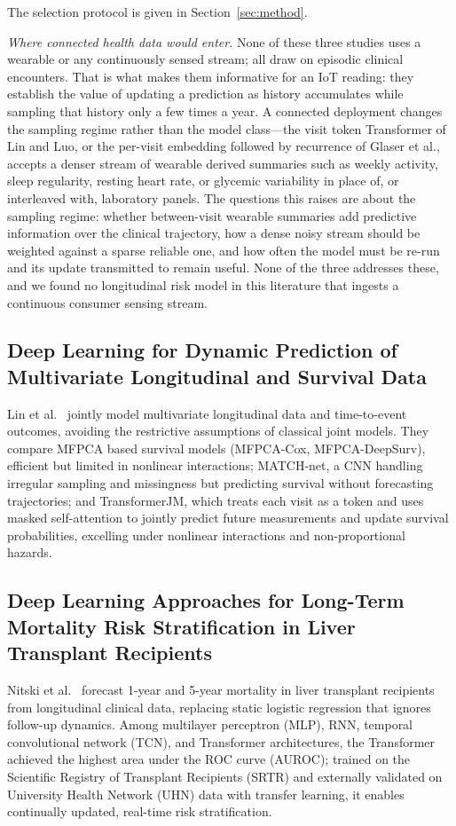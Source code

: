 \documentclass[journal]{IEEEtran}
\begin{document}
The selection protocol is given in Section~\ref{sec:method}.

\emph{Where connected health data would enter.} None of these three studies uses a wearable or any continuously sensed stream; all draw on episodic clinical encounters. That is what makes them informative for an IoT reading: they establish the value of updating a prediction as history accumulates while sampling that history only a few times a year. A connected deployment changes the sampling regime rather than the model class---the visit token Transformer of Lin and Luo, or the per-visit embedding followed by recurrence of Glaser et al., accepts a denser stream of wearable derived summaries such as weekly activity, sleep regularity, resting heart rate, or glycemic variability in place of, or interleaved with, laboratory panels. The questions this raises are about the sampling regime: whether between-visit wearable summaries add predictive information over the clinical trajectory, how a dense noisy stream should be weighted against a sparse reliable one, and how often the model must be re-run and its update transmitted to remain useful. None of the three addresses these, and we found no longitudinal risk model in this literature that ingests a continuous consumer sensing stream.


\subsection{Deep Learning for Dynamic Prediction of Multivariate Longitudinal and Survival Data}
Lin et al.~\cite{lin2022deep} jointly model multivariate longitudinal data and time-to-event outcomes, avoiding the restrictive assumptions of classical joint models. They compare MFPCA based survival models (MFPCA-Cox, MFPCA-DeepSurv), efficient but limited in nonlinear interactions; MATCH-net, a CNN handling irregular sampling and missingness but predicting survival without forecasting trajectories; and TransformerJM, which treats each visit as a token and uses masked self-attention to jointly predict future measurements and update survival probabilities, excelling under nonlinear interactions and non-proportional hazards.

\subsection{Deep Learning Approaches for Long-Term Mortality Risk Stratification in Liver Transplant Recipients}

Nitski et al.~\cite{nitski2021long} forecast 1-year and 5-year mortality in liver transplant recipients from longitudinal clinical data, replacing static logistic regression that ignores follow-up dynamics. Among multilayer perceptron (MLP), RNN, temporal convolutional network (TCN), and Transformer architectures, the Transformer achieved the highest area under the ROC curve (AUROC); trained on the Scientific Registry of Transplant Recipients (SRTR) and externally validated on University Health Network (UHN) data with transfer learning, it enables continually updated, real-time risk stratification.
\end{document}
